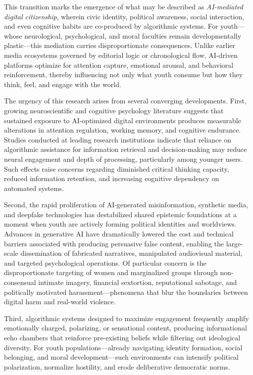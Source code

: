 \documentclass[12pt,a4paper]{report}
\begin{document}
This transition marks the emergence of what may be described as \emph{AI-mediated digital citizenship}, wherein civic identity, political awareness, social interaction, and even cognitive habits are co-produced by algorithmic systems. For youth—whose neurological, psychological, and moral faculties remain developmentally plastic—this mediation carries disproportionate consequences. Unlike earlier media ecosystems governed by editorial logic or chronological flow, AI-driven platforms optimize for attention capture, emotional arousal, and behavioral reinforcement, thereby influencing not only what youth consume but how they think, feel, and engage with the world.

The urgency of this research arises from several converging developments. First, growing neuroscientific and cognitive psychology literature suggests that sustained exposure to AI-optimized digital environments produces measurable alterations in attention regulation, working memory, and cognitive endurance. Studies conducted at leading research institutions indicate that reliance on algorithmic assistance for information retrieval and decision-making may reduce neural engagement and depth of processing, particularly among younger users. Such effects raise concerns regarding diminished critical thinking capacity, reduced information retention, and increasing cognitive dependency on automated systems.

Second, the rapid proliferation of AI-generated misinformation, synthetic media, and deepfake technologies has destabilized shared epistemic foundations at a moment when youth are actively forming political identities and worldviews. Advances in generative AI have dramatically lowered the cost and technical barriers associated with producing persuasive false content, enabling the large-scale dissemination of fabricated narratives, manipulated audiovisual material, and targeted psychological operations. Of particular concern is the disproportionate targeting of women and marginalized groups through non-consensual intimate imagery, financial sextortion, reputational sabotage, and politically motivated harassment—phenomena that blur the boundaries between digital harm and real-world violence.

Third, algorithmic systems designed to maximize engagement frequently amplify emotionally charged, polarizing, or sensational content, producing informational echo chambers that reinforce pre-existing beliefs while filtering out ideological diversity. For youth populations—already navigating identity formation, social belonging, and moral development—such environments can intensify political polarization, normalize hostility, and erode deliberative democratic norms.
\end{document}
